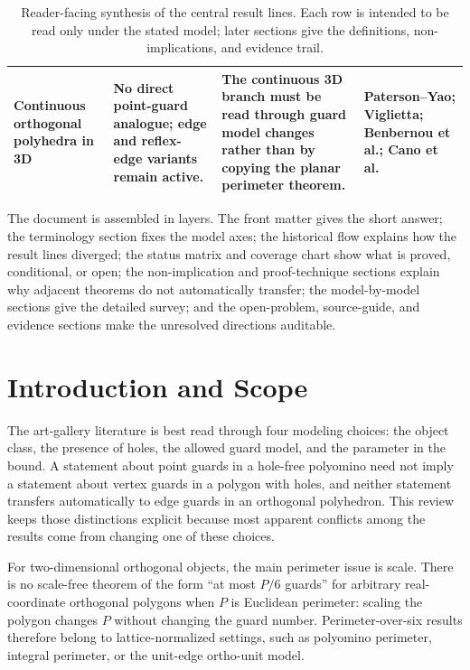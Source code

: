 \documentclass[11pt]{article}
\begin{document}
\begin{table}[htbp]
\begin{tabularx}{\textwidth}{
  >{\raggedright\arraybackslash}p{}
  >{\raggedright\arraybackslash}p{}
  Y
  >{\raggedright\arraybackslash}p{0.18\textwidth}}
Continuous orthogonal polyhedra in 3D & No direct point-guard analogue; edge
and reflex-edge variants remain active. & The continuous 3D branch must be
read through guard model changes rather than by copying the planar perimeter
theorem. &
Paterson--Yao; Viglietta; Benbernou et al.; Cano et al.
\cite{PatersonYao1992,VigliettaThesis,BenbernouEtAl2011,CanoTothUrrutiaViglietta2022} \\
\bottomrule
\end{tabularx}
\caption{Reader-facing synthesis of the central result lines.  Each row is
intended to be read only under the stated model; later sections give the
definitions, non-implications, and evidence trail.}
\label{tab:executive-synthesis}
\end{table}

The document is assembled in layers.  The front matter gives the short answer;
the terminology section fixes the model axes; the historical flow explains how
the result lines diverged; the status matrix and coverage chart show what is
proved, conditional, or open; the non-implication and proof-technique sections
explain why adjacent theorems do not automatically transfer; the model-by-model
sections give the detailed survey; and the open-problem, source-guide, and
evidence sections make the unresolved directions auditable.

\section{Introduction and Scope}

The art-gallery literature is best read through four modeling choices: the
object class, the presence of holes, the allowed guard model, and the
parameter in the bound.  A statement about point guards in a hole-free
polyomino need not imply a statement about vertex guards in a polygon with
holes, and neither statement transfers automatically to edge guards in an
orthogonal polyhedron.  This review keeps those distinctions explicit because
most apparent conflicts among the results come from changing one of these
choices.

For two-dimensional orthogonal objects, the main perimeter issue is scale.
There is no scale-free theorem of the form ``at most $P/6$ guards'' for
arbitrary real-coordinate orthogonal polygons when $P$ is Euclidean
perimeter: scaling the polygon changes $P$ without changing the guard number.
Perimeter-over-six results therefore belong to lattice-normalized settings,
such as polyomino perimeter, integral perimeter, or the unit-edge
ortho-unit model.
\end{document}
